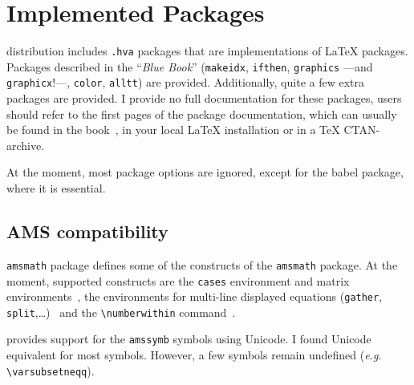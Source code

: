 \section{Implemented Packages}\label{implemented:package}
%
\hevea{} distribution includes \texttt{.hva} packages that are
implementations of \LaTeX{} packages.
Packages described in the ``\emph{Blue Book}'' (\texttt{makeidx},
\texttt{ifthen}, \texttt{graphics} ---and \texttt{graphicx}!---,
\texttt{color}, \texttt{alltt}) are provided.  Additionally, quite a
few extra packages are provided.  I provide no full documentation for
these packages, users should refer to the first pages of the package
documentation, which can usually be found in the book~\cite{latexbis},
in your local
\LaTeX{} installation or in a TeX CTAN-archive.

At the moment, most package options are ignored, except for the babel
package, where it is essential.

\subsection{AMS compatibility}
%
\hevea{} \texttt{amsmath} package defines  some of the constructs of the
\texttt{amsmath} package.  At the moment, supported constructs are
the \verb+cases+ environment and matrix
environments~\cite[Section~8.4]{latexbis}, the
environments for multi-line displayed
equations (\verb+gather+,
\verb+split+,\ldots)~\cite[Section~8.5]{latexbis} and the
\verb+\numberwithin+ command~\cite[Section~8.6.2]{latexbis}.

%
\hevea{} provides support for the \texttt{amssymb} symbols using
Unicode. I found Unicode equivalent for most symbols. However, a few symbols
remain undefined (\emph{e.g.} \verb+\varsubsetneqq+).

